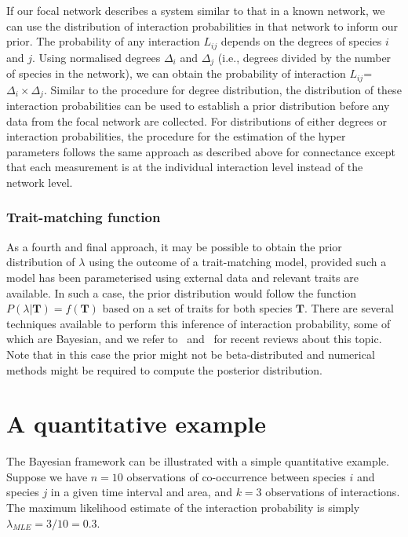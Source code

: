 \documentclass[12pt]{article}
\begin{document}
\begin{spacing}{2.0}
          If our focal network describes a system similar to that in a known network, we can use the distribution of interaction probabilities in that network to inform our prior. The probability of any interaction $L_{ij}$ depends on the degrees of species $i$ and $j$. Using normalised degrees $\Delta_i$ and $\Delta_j$ (i.e., degrees divided by the number of species in the network), we can obtain the probability of interaction $L_{ij}$=$\Delta_i\times\Delta_j$. Similar to the procedure for degree distribution, the distribution of these interaction probabilities can be used to establish a prior distribution before any data from the focal network are collected. For distributions of either degrees or interaction probabilities, the procedure for the estimation of the hyper parameters follows the same approach as described above for connectance except that each measurement is at the individual interaction level instead of the network level.


      \subsubsection*{Trait-matching function} 

          As a fourth and final approach, it may be possible to obtain the prior distribution of $\lambda$ using the outcome of a trait-matching model, provided such a model has been parameterised using external data and relevant traits are available. In such a case, the prior distribution would follow the function $P(\lambda|\mathbf{T})=f(\mathbf{T})$ based on a set of traits for both species $\mathbf{T}$. There are several techniques available to perform this inference of interaction probability, some of which are Bayesian, and we refer to~\citet{Bartomeus2016} and~\citet{Weinstein2017} for recent reviews about this topic. Note that in this case the prior might not be beta-distributed and numerical methods might be required to compute the posterior distribution.  


\section*{A quantitative example}

  The Bayesian framework can be illustrated with a simple quantitative example. Suppose we have $n = 10$ observations of co-occurrence between species $i$ and species $j$ in a given time interval and area, and $k = 3$ observations of interactions. The maximum likelihood estimate of the interaction probability is simply $\lambda_{MLE} = 3/10 = 0.3$. 
  


\end{spacing}
\end{document}
